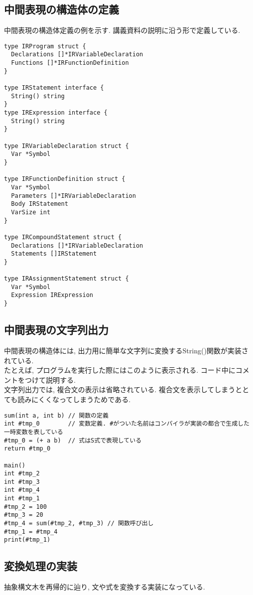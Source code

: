 \documentclass[a4j]{jarticle}
\begin{document}
\subsection{中間表現の構造体の定義}

中間表現の構造体定義の例を示す. 講義資料の説明に沿う形で定義している.

\begin{verbatim}
type IRProgram struct {
  Declarations []*IRVariableDeclaration
  Functions []*IRFunctionDefinition
}

type IRStatement interface {
  String() string
}
type IRExpression interface {
  String() string
}

type IRVariableDeclaration struct {
  Var *Symbol
}

type IRFunctionDefinition struct {
  Var *Symbol
  Parameters []*IRVariableDeclaration
  Body IRStatement
  VarSize int
}

type IRCompoundStatement struct {
  Declarations []*IRVariableDeclaration
  Statements []IRStatement
}

type IRAssignmentStatement struct {
  Var *Symbol
  Expression IRExpression
}
\end{verbatim}

\subsection{中間表現の文字列出力}
中間表現の構造体には, 出力用に簡単な文字列に変換するString()関数が実装されている. \\

たとえば, プログラムを実行した際にはこのように表示される. コード中にコメントをつけて説明する. \\

文字列出力では, 複合文の表示は省略されている. 複合文を表示してしまうととても読みにくくなってしまうためである. \\

\begin{verbatim}
sum(int a, int b) // 関数の定義
int #tmp_0        // 変数定義. #がついた名前はコンパイラが実装の都合で生成した一時変数を表している
#tmp_0 = (+ a b)  // 式はS式で表現している
return #tmp_0

main()
int #tmp_2
int #tmp_3
int #tmp_4
int #tmp_1
#tmp_2 = 100
#tmp_3 = 20
#tmp_4 = sum(#tmp_2, #tmp_3) // 関数呼び出し
#tmp_1 = #tmp_4
print(#tmp_1)
\end{verbatim}

\subsection{変換処理の実装}
抽象構文木を再帰的に辿り, 文や式を変換する実装になっている. \\
\end{document}
